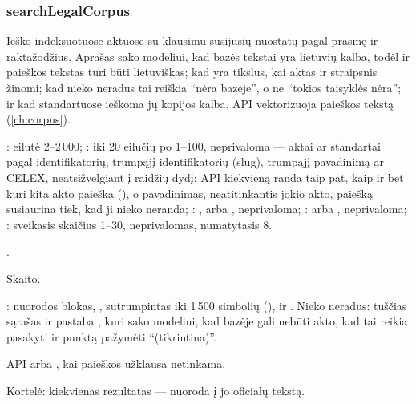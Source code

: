 \subsubsection{searchLegalCorpus}\label{sec:tools:searchLegalCorpus}
\begin{description}[style=multiline, leftmargin=19mm, labelwidth=17mm, labelsep=2mm,
  font=\sffamily\bfseries\footnotesize\color{ink}, itemsep=1pt, topsep=2pt, before=\raggedright]
  \item[Paskirtis] Ieško indeksuotuose aktuose su klausimu susijusių nuostatų pagal prasmę ir
    raktažodžius. Aprašas sako modeliui, kad bazės tekstai yra lietuvių kalba, todėl ir
    paieškos tekstas turi būti lietuviškas; kad  yra tikslus, kai aktas
    ir straipsnis žinomi; kad nieko neradus tai reiškia \enquote{nėra bazėje}, o ne
    \enquote{tokios taisyklės nėra}; ir kad standartuose ieškoma jų kopijos kalba. API
    vektorizuoja paieškos tekstą (\cref{ch:corpus}).
  \item[Įvestis] : eilutė 2--2\,000; : iki 20 eilučių po 1--100,
    neprivaloma --- aktai ar standartai pagal identifikatorių, trumpąjį identifikatorių
    (slug), trumpąjį pavadinimą ar CELEX, neatsižvelgiant į raidžių dydį: API kiekvieną randa
    taip pat, kaip ir bet kuri kita akto paieška (), o pavadinimas,
    neatitinkantis jokio akto, paiešką susiaurina tiek, kad ji nieko neranda;
    : ,  arba
    , neprivaloma; :  arba , neprivaloma;
    : sveikasis skaičius 1--30, neprivalomas, numatytasis 8.
  \item[Užklausos] .
  \item[Pobūdis] Skaito.
  \item[Grąžina] : nuorodos blokas, , sutrumpintas iki 1\,500 simbolių
    (), ir . Nieko neradus: tuščias sąrašas ir pastaba
    , kuri sako modeliui, kad bazėje gali nebūti akto, kad tai reikia pasakyti ir
    punktą pažymėti \enquote{(tikrintina)}.
  \item[Klaidos] API  arba , kai paieškos užklausa
    netinkama.
  \item[Konsolė] Kortelė: kiekvienas rezultatas --- nuoroda į jo oficialų tekstą.
\end{description}

